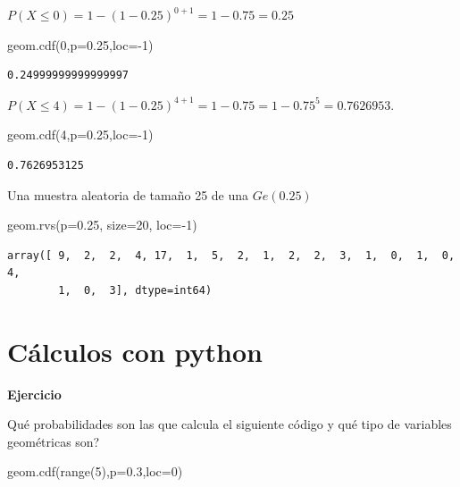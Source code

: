 \documentclass[
  letterpaper,
  DIV=11,
  numbers=noendperiod]{scrreprt}
\newenvironment{Shaded}{\begin{snugshade}}{\end{snugshade}}
\newcommand{\BuiltInTok}[1]{\textcolor[rgb]{0.00,0.23,0.31}{#1}}
\newcommand{\DecValTok}[1]{\textcolor[rgb]{0.68,0.00,0.00}{#1}}
\newcommand{\FloatTok}[1]{\textcolor[rgb]{0.68,0.00,0.00}{#1}}
\newcommand{\NormalTok}[1]{\textcolor[rgb]{0.00,0.23,0.31}{#1}}
\newcommand{\OperatorTok}[1]{\textcolor[rgb]{0.37,0.37,0.37}{#1}}
\begin{document}
\(P(X\leq 0)=1- (1-0.25)^{0+1}=1-0.75=0.25\)

\begin{Shaded}
\begin{Highlighting}[]
\NormalTok{geom.cdf(}\DecValTok{0}\NormalTok{,p}\OperatorTok{=}\FloatTok{0.25}\NormalTok{,loc}\OperatorTok{={-}}\DecValTok{1}\NormalTok{)}
\end{Highlighting}
\end{Shaded}

\begin{verbatim}
0.24999999999999997
\end{verbatim}

\(P(X\leq 4)=1-(1-0.25)^{4+1}=1-0.75=1-0.75^5=0.7626953.\)

\begin{Shaded}
\begin{Highlighting}[]
\NormalTok{geom.cdf(}\DecValTok{4}\NormalTok{,p}\OperatorTok{=}\FloatTok{0.25}\NormalTok{,loc}\OperatorTok{={-}}\DecValTok{1}\NormalTok{)}
\end{Highlighting}
\end{Shaded}

\begin{verbatim}
0.7626953125
\end{verbatim}

Una muestra aleatoria de tamaño 25 de una \(Ge(0.25)\)

\begin{Shaded}
\begin{Highlighting}[]
\NormalTok{geom.rvs(p}\OperatorTok{=}\FloatTok{0.25}\NormalTok{, size}\OperatorTok{=}\DecValTok{20}\NormalTok{, loc}\OperatorTok{={-}}\DecValTok{1}\NormalTok{)}
\end{Highlighting}
\end{Shaded}

\begin{verbatim}
array([ 9,  2,  2,  4, 17,  1,  5,  2,  1,  2,  2,  3,  1,  0,  1,  0,  4,
        1,  0,  3], dtype=int64)
\end{verbatim}

\section{Cálculos con python}\label{cuxe1lculos-con-python-2}

\textbf{Ejercicio}

Qué probabilidades son las que calcula el siguiente código y qué tipo de
variables geométricas son?

\begin{Shaded}
\begin{Highlighting}[]
\NormalTok{geom.cdf(}\BuiltInTok{range}\NormalTok{(}\DecValTok{5}\NormalTok{),p}\OperatorTok{=}\FloatTok{0.3}\NormalTok{,loc}\OperatorTok{=}\DecValTok{0}\NormalTok{)}
\end{Highlighting}
\end{Shaded}
\end{document}
